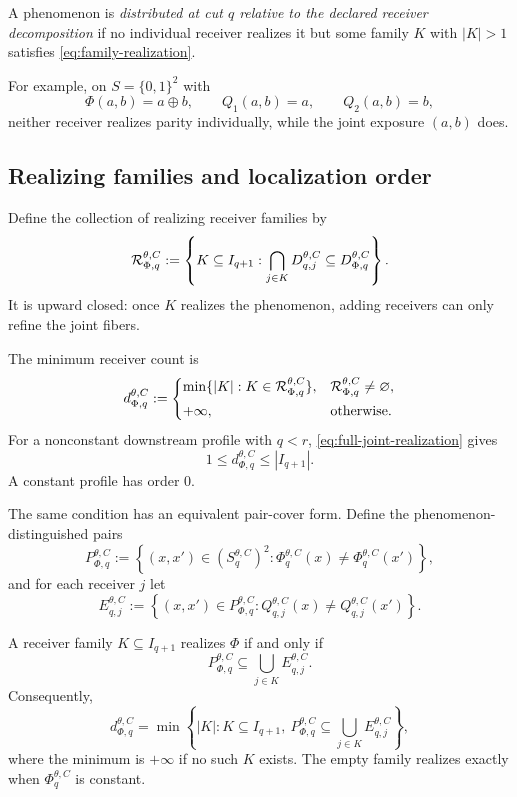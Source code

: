 \begin{definition}
A phenomenon is \emph{distributed at cut $q$ relative to the declared receiver decomposition} if no individual receiver realizes it but some family $K$ with $|K|>1$ satisfies \eqref{eq:family-realization}.
\end{definition}

For example, on $S=\{0,1\}^2$ with
\[
\Phi(a,b)=a\oplus b,
\qquad
Q_1(a,b)=a,
\qquad
Q_2(a,b)=b,
\]
neither receiver realizes parity individually, while the joint exposure $(a,b)$ does.

\subsection{Realizing families and localization order}

Define the collection of realizing receiver families by
\begin{equation}
\mathcal{R}_{\Phi,q}^{\theta,C}
:=
\left\{
K\subseteq I_{q+1}:
\bigcap_{j\in K}D_{q,j}^{\theta,C}
\subseteq
D_{\Phi,q}^{\theta,C}
\right\}.
\label{eq:realizing-families}
\end{equation}
It is upward closed: once $K$ realizes the phenomenon, adding receivers can only refine the joint fibers.

The minimum receiver count is
\begin{equation}
d_{\Phi,q}^{\theta,C}
:=
\begin{cases}
\min\{|K|:K\in\mathcal{R}_{\Phi,q}^{\theta,C}\},
&\mathcal{R}_{\Phi,q}^{\theta,C}\neq\varnothing,\\[0.3em]
+\infty,&\text{otherwise.}
\end{cases}
\label{eq:realization-order}
\end{equation}
For a nonconstant downstream profile with $q<r$, \eqref{eq:full-joint-realization} gives
\[
1\le d_{\Phi,q}^{\theta,C}\le |I_{q+1}|.
\]
A constant profile has order $0$.

The same condition has an equivalent pair-cover form. Define the phenomenon-distinguished pairs
\[
P_{\Phi,q}^{\theta,C}
:=
\left\{
(x,x')\in (S_q^{\theta,C})^2:
\Phi_q^{\theta,C}(x)\neq\Phi_q^{\theta,C}(x')
\right\},
\]
and for each receiver $j$ let
\[
E_{q,j}^{\theta,C}
:=
\left\{
(x,x')\in P_{\Phi,q}^{\theta,C}:
Q_{q,j}^{\theta,C}(x)\neq Q_{q,j}^{\theta,C}(x')
\right\}.
\]

\begin{proposition}
\label{prop:pair-cover}
A receiver family $K\subseteq I_{q+1}$ realizes $\Phi$ if and only if
\begin{equation}
P_{\Phi,q}^{\theta,C}
\subseteq
\bigcup_{j\in K}E_{q,j}^{\theta,C}.
\label{eq:pair-cover}
\end{equation}
Consequently,
\begin{equation}
d_{\Phi,q}^{\theta,C}
=
\min\left\{
|K|:
K\subseteq I_{q+1},\ 
P_{\Phi,q}^{\theta,C}
\subseteq
\bigcup_{j\in K}E_{q,j}^{\theta,C}
\right\},
\label{eq:pair-cover-order}
\end{equation}
where the minimum is $+\infty$ if no such $K$ exists. The empty family realizes exactly when $\Phi_q^{\theta,C}$ is constant.
\end{proposition}


